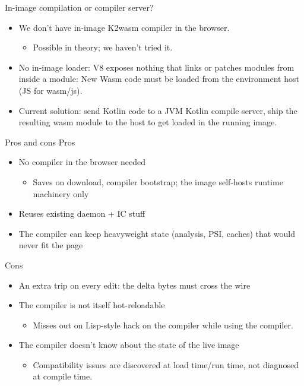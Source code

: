 \documentclass[10pt,presentation]{beamer}
\begin{document}
\begin{frame}[label={sec:org54bc011}]{In-image compilation or compiler server?}
\begin{itemize}
\item We don't have in-image K2wasm compiler in the browser.
\begin{itemize}
\item Possible in theory; we haven't tried it.
\end{itemize}
\item No in-image loader: V8 exposes nothing that links or patches modules
from inside a module: New Wasm code must be loaded from the
environment host (JS for wasm/js).
\item Current solution: send Kotlin code to a JVM Kotlin compile server,
ship the resulting wasm module to the host to get loaded in the
running image.
\end{itemize}
\end{frame}
\begin{frame}[label={sec:orge876240}]{Pros and cons}
\alert{Pros}

\begin{itemize}
\item No compiler in the browser needed
\begin{itemize}
\item Saves on download, compiler bootstrap; the image self-hosts
\alert{runtime} machinery only
\end{itemize}
\item Reuses existing daemon + IC stuff
\item The compiler can keep heavyweight state (analysis, PSI, caches) that
would never fit the page
\end{itemize}

\alert{Cons}

\begin{itemize}
\item An extra trip on every edit: the delta bytes must cross the wire
\item The compiler is not itself hot-reloadable
\begin{itemize}
\item Misses out on Lisp-style hack on the compiler while using the
compiler.
\end{itemize}
\item The compiler doesn't know about the state of the live image
\begin{itemize}
\item Compatibility issues are discovered at load time/run time, not
diagnosed at compile time.
\end{itemize}
\end{itemize}
\end{frame}
\end{document}
